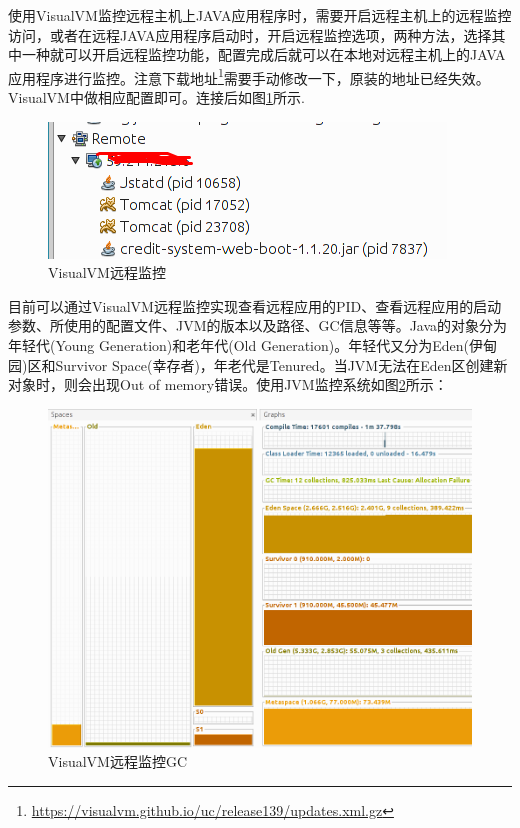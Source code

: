 \documentclass[12pt]{book}
\numberwithin{dummy}{section}
\theoremstyle{ocrenumbox}
\theoremstyle{blacknumex}
\theoremstyle{blacknumbox}
\theoremstyle{ocrenum}
\begin{document}
使用VisualVM监控远程主机上JAVA应用程序时，需要开启远程主机上的远程监控访问，或者在远程JAVA应用程序启动时，开启远程监控选项，两种方法，选择其中一种就可以开启远程监控功能，配置完成后就可以在本地对远程主机上的JAVA应用程序进行监控。注意下载地址\footnote{\url{https://visualvm.github.io/uc/release139/updates.xml.gz}}需要手动修改一下，原装的地址已经失效。VisualVM中做相应配置即可。连接后如图\ref{fig:visualvmconnectremote}所示.

\begin{figure}[htbp]
	\centering
	\includegraphics[scale=0.7]{visualvmconnectremote.png}
	\caption{VisualVM远程监控}
	\label{fig:visualvmconnectremote}
\end{figure}

目前可以通过VisualVM远程监控实现查看远程应用的PID、查看远程应用的启动参数、所使用的配置文件、JVM的版本以及路径、GC信息等等。Java的对象分为年轻代(Young Generation)和老年代(Old Generation)。年轻代又分为Eden(伊甸园)区和Survivor Space(幸存者)，年老代是Tenured。当JVM无法在Eden区创建新对象时，则会出现Out of memory错误。使用JVM监控系统如图\ref{fig:monitorsystemmemory}所示：


\begin{figure}[htbp]
	\centering
	\includegraphics[scale=0.3]{monitorsystemmemory.png}
	\caption{VisualVM远程监控GC}
	\label{fig:monitorsystemmemory}
\end{figure}
\end{document}
